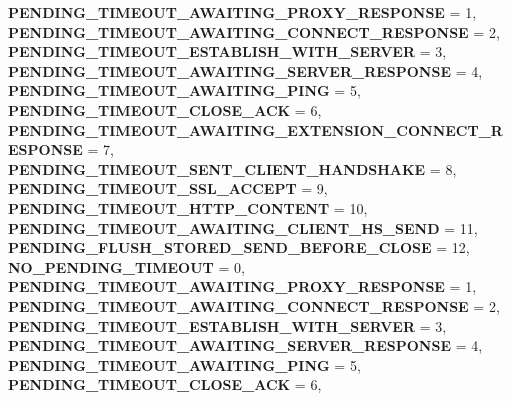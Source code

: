 \begin{DoxyCompactItemize}
{\bfseries P\+E\+N\+D\+I\+N\+G\+\_\+\+T\+I\+M\+E\+O\+U\+T\+\_\+\+A\+W\+A\+I\+T\+I\+N\+G\+\_\+\+P\+R\+O\+X\+Y\+\_\+\+R\+E\+S\+P\+O\+N\+SE} = 1, 
{\bfseries P\+E\+N\+D\+I\+N\+G\+\_\+\+T\+I\+M\+E\+O\+U\+T\+\_\+\+A\+W\+A\+I\+T\+I\+N\+G\+\_\+\+C\+O\+N\+N\+E\+C\+T\+\_\+\+R\+E\+S\+P\+O\+N\+SE} = 2, 
{\bfseries P\+E\+N\+D\+I\+N\+G\+\_\+\+T\+I\+M\+E\+O\+U\+T\+\_\+\+E\+S\+T\+A\+B\+L\+I\+S\+H\+\_\+\+W\+I\+T\+H\+\_\+\+S\+E\+R\+V\+ER} = 3, 
\newline
{\bfseries P\+E\+N\+D\+I\+N\+G\+\_\+\+T\+I\+M\+E\+O\+U\+T\+\_\+\+A\+W\+A\+I\+T\+I\+N\+G\+\_\+\+S\+E\+R\+V\+E\+R\+\_\+\+R\+E\+S\+P\+O\+N\+SE} = 4, 
{\bfseries P\+E\+N\+D\+I\+N\+G\+\_\+\+T\+I\+M\+E\+O\+U\+T\+\_\+\+A\+W\+A\+I\+T\+I\+N\+G\+\_\+\+P\+I\+NG} = 5, 
{\bfseries P\+E\+N\+D\+I\+N\+G\+\_\+\+T\+I\+M\+E\+O\+U\+T\+\_\+\+C\+L\+O\+S\+E\+\_\+\+A\+CK} = 6, 
{\bfseries P\+E\+N\+D\+I\+N\+G\+\_\+\+T\+I\+M\+E\+O\+U\+T\+\_\+\+A\+W\+A\+I\+T\+I\+N\+G\+\_\+\+E\+X\+T\+E\+N\+S\+I\+O\+N\+\_\+\+C\+O\+N\+N\+E\+C\+T\+\_\+\+R\+E\+S\+P\+O\+N\+SE} = 7, 
\newline
{\bfseries P\+E\+N\+D\+I\+N\+G\+\_\+\+T\+I\+M\+E\+O\+U\+T\+\_\+\+S\+E\+N\+T\+\_\+\+C\+L\+I\+E\+N\+T\+\_\+\+H\+A\+N\+D\+S\+H\+A\+KE} = 8, 
{\bfseries P\+E\+N\+D\+I\+N\+G\+\_\+\+T\+I\+M\+E\+O\+U\+T\+\_\+\+S\+S\+L\+\_\+\+A\+C\+C\+E\+PT} = 9, 
{\bfseries P\+E\+N\+D\+I\+N\+G\+\_\+\+T\+I\+M\+E\+O\+U\+T\+\_\+\+H\+T\+T\+P\+\_\+\+C\+O\+N\+T\+E\+NT} = 10, 
{\bfseries P\+E\+N\+D\+I\+N\+G\+\_\+\+T\+I\+M\+E\+O\+U\+T\+\_\+\+A\+W\+A\+I\+T\+I\+N\+G\+\_\+\+C\+L\+I\+E\+N\+T\+\_\+\+H\+S\+\_\+\+S\+E\+ND} = 11, 
\newline
{\bfseries P\+E\+N\+D\+I\+N\+G\+\_\+\+F\+L\+U\+S\+H\+\_\+\+S\+T\+O\+R\+E\+D\+\_\+\+S\+E\+N\+D\+\_\+\+B\+E\+F\+O\+R\+E\+\_\+\+C\+L\+O\+SE} = 12, 
{\bfseries N\+O\+\_\+\+P\+E\+N\+D\+I\+N\+G\+\_\+\+T\+I\+M\+E\+O\+UT} = 0, 
{\bfseries P\+E\+N\+D\+I\+N\+G\+\_\+\+T\+I\+M\+E\+O\+U\+T\+\_\+\+A\+W\+A\+I\+T\+I\+N\+G\+\_\+\+P\+R\+O\+X\+Y\+\_\+\+R\+E\+S\+P\+O\+N\+SE} = 1, 
{\bfseries P\+E\+N\+D\+I\+N\+G\+\_\+\+T\+I\+M\+E\+O\+U\+T\+\_\+\+A\+W\+A\+I\+T\+I\+N\+G\+\_\+\+C\+O\+N\+N\+E\+C\+T\+\_\+\+R\+E\+S\+P\+O\+N\+SE} = 2, 
\newline
{\bfseries P\+E\+N\+D\+I\+N\+G\+\_\+\+T\+I\+M\+E\+O\+U\+T\+\_\+\+E\+S\+T\+A\+B\+L\+I\+S\+H\+\_\+\+W\+I\+T\+H\+\_\+\+S\+E\+R\+V\+ER} = 3, 
{\bfseries P\+E\+N\+D\+I\+N\+G\+\_\+\+T\+I\+M\+E\+O\+U\+T\+\_\+\+A\+W\+A\+I\+T\+I\+N\+G\+\_\+\+S\+E\+R\+V\+E\+R\+\_\+\+R\+E\+S\+P\+O\+N\+SE} = 4, 
{\bfseries P\+E\+N\+D\+I\+N\+G\+\_\+\+T\+I\+M\+E\+O\+U\+T\+\_\+\+A\+W\+A\+I\+T\+I\+N\+G\+\_\+\+P\+I\+NG} = 5, 
{\bfseries P\+E\+N\+D\+I\+N\+G\+\_\+\+T\+I\+M\+E\+O\+U\+T\+\_\+\+C\+L\+O\+S\+E\+\_\+\+A\+CK} = 6, 

\end{DoxyCompactItemize}
